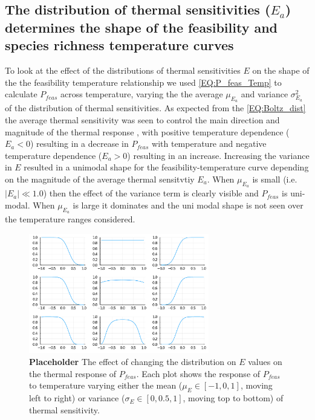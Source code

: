 \documentclass{article}
\begin{document}
\subsection{The distribution of thermal sensitivities ($E_a$)  determines the shape of the feasibility and species richness temperature curves}

To look at the effect of the distributions of thermal sensitivities $E$ on the shape of the the feasibility temperature relationship we used \cref{EQ:P_feas_Temp} to calculate $P_{feas}$ across temperature, varying the the average $\mu_{E_a}$ and variance $\sigma_{E_a}^2$ of the distribution of thermal sensitivities. As expected from the \cref{EQ:Boltz_dist} the average thermal sensitivity was seen to control the main direction and magnitude of the thermal response , with positive temperature dependence ($E_a < 0$) resulting in a decrease in $P_{feas}$ with temperature and negative temperature dependence ($E_a > 0$) resulting in an increase. Increasing the variance in $E$ resulted in a unimodal shape for the feasibility-temperature curve depending on the magnitude of the average thermal sensitvtiy $E_a$. When $\mu_{E_a}$ is small (i.e. $|E_a| \ll 1.0$) then the effect of the variance term is clearly visible and $P_{feas}$ is uni-modal. When $\mu_{E_a}$ is large it dominates and the uni modal shape is not seen over the temperature ranges considered. 

\begin{figure}[h!]
    \centering
    \includegraphics[width = 0.7\textwidth]{docs/Figures/P_feas_grid.pdf}
    \caption{\textbf{Placeholder} The effect of changing the distribution on $E$ values on the thermal response of $P_{feas}$. Each plot shows the response of $P_{feas}$ to temperature varying either the mean ($\mu_E \in [-1 , 0 , 1]$, moving left to right) or variance ($\sigma_E \in [0, 0.5, 1]$, moving top to bottom) of thermal sensitivity.}
    \label{Fig:P_feas_grid}
\end{figure}
\end{document}
